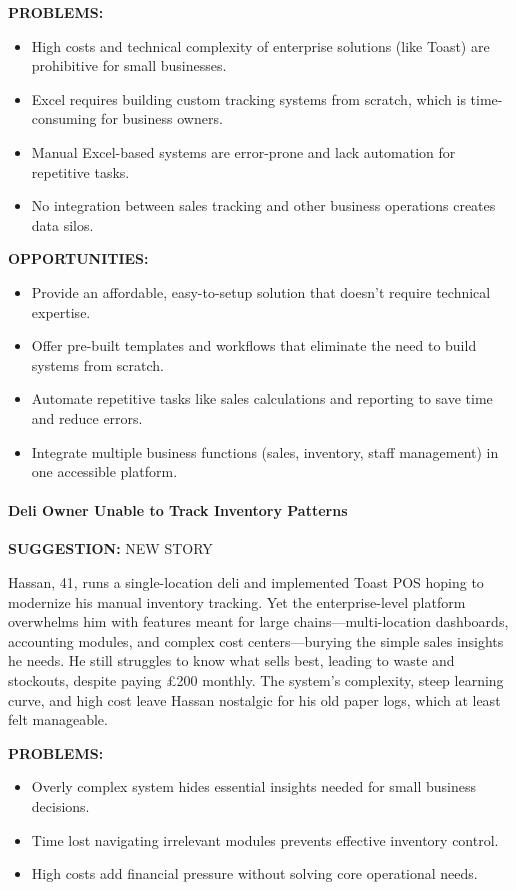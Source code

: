 \documentclass[]{VUMIFTemplateClass}
\newcommand{\suggestioncomment}[1]{%
    \definecolor{lime}{RGB}{50,205,50}%
    \begin{tcolorbox}[colback=lime!15, colframe=lime!60, arc=0pt, outer arc=0pt, boxrule=1pt, left=3pt, right=3pt, top=3pt, bottom=3pt]
        \textbf{\textcolor{lime!70!black}{SUGGESTION:}} #1
    \end{tcolorbox}%
}
\newcommand{\subsubsubsection}[1]{\paragraph{#1}}
\begin{document}
\textbf{PROBLEMS:}
\begin{itemize}
    \item High costs and technical complexity of enterprise solutions (like Toast) are prohibitive for small businesses.
    \item Excel requires building custom tracking systems from scratch, which is time-consuming for business owners.
    \item Manual Excel-based systems are error-prone and lack automation for repetitive tasks.
    \item No integration between sales tracking and other business operations creates data silos.
\end{itemize}
\textbf{OPPORTUNITIES:}
\begin{itemize}
    \item Provide an affordable, easy-to-setup solution that doesn't require technical expertise.
    \item Offer pre-built templates and workflows that eliminate the need to build systems from scratch.
    \item Automate repetitive tasks like sales calculations and reporting to save time and reduce errors.
    \item Integrate multiple business functions (sales, inventory, staff management) in one accessible platform.
\end{itemize}

\subsubsubsection{Deli Owner Unable to Track Inventory Patterns}
\suggestioncomment{NEW STORY}
Hassan, 41, runs a single-location deli and implemented Toast POS hoping to
modernize his manual inventory tracking. Yet the enterprise-level platform
overwhelms him with features meant for large chains—multi-location dashboards,
accounting modules, and complex cost centers—burying the simple sales insights
he needs. He still struggles to know what sells best, leading to waste and
stockouts, despite paying £200 monthly. The system’s complexity, steep learning
curve, and high cost leave Hassan nostalgic for his old paper logs, which at
least felt manageable.

\textbf{PROBLEMS:}
\begin{itemize}
    \item Overly complex system hides essential insights needed for small business decisions.
    \item Time lost navigating irrelevant modules prevents effective inventory control.
    \item High costs add financial pressure without solving core operational needs.
\end{itemize}
\end{document}
